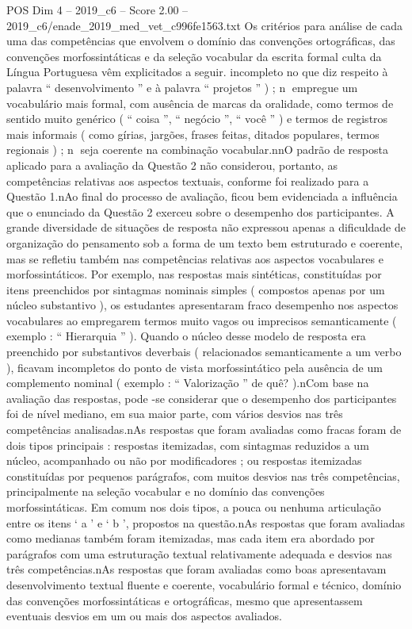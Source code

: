\begin{textsample}{POS Dim 4 – 2019\_c6 – Score 2.00 – 2019\_c6/enade\_2019\_med\_vet\_c996fe1563.txt}
Os critérios para análise de cada uma das competências que envolvem o domínio das convenções ortográficas, das convenções morfossintáticas e da seleção vocabular da escrita formal culta da Língua Portuguesa vêm explicitados a seguir. incompleto no que diz respeito à palavra “ desenvolvimento ” e à palavra “ projetos ” ) ; n empregue um vocabulário mais formal, com ausência de marcas da oralidade, como termos de sentido muito genérico ( “ coisa ”, “ negócio ”, “ você ” ) e termos de registros mais informais ( como gírias, jargões, frases feitas, ditados populares, termos regionais ) ; n seja coerente na combinação vocabular.nnO padrão de resposta aplicado para a avaliação da Questão 2 não considerou, portanto, as competências relativas aos aspectos textuais, conforme foi realizado para a Questão 1.nAo final do processo de avaliação, ficou bem evidenciada a influência que o enunciado da Questão 2 exerceu sobre o desempenho dos participantes.
A grande diversidade de situações de resposta não expressou apenas a dificuldade de organização do pensamento sob a forma de um texto bem estruturado e coerente, mas se refletiu também nas competências relativas aos aspectos vocabulares e morfossintáticos.
Por exemplo, nas respostas mais sintéticas, constituídas por itens preenchidos por sintagmas nominais simples ( compostos apenas por um núcleo substantivo ), os estudantes apresentaram fraco desempenho nos aspectos vocabulares ao empregarem termos muito vagos ou imprecisos semanticamente ( exemplo : “ Hierarquia ” ).
Quando o núcleo desse modelo de resposta era preenchido por substantivos deverbais ( relacionados semanticamente a um verbo ), ficavam incompletos do ponto de vista morfossintático pela ausência de um complemento nominal ( exemplo : “ Valorização ” de quê? ).nCom base na avaliação das respostas, pode -se considerar que o desempenho dos participantes foi de nível mediano, em sua maior parte, com vários desvios nas três competências analisadas.nAs respostas que foram avaliadas como fracas foram de dois tipos principais : respostas itemizadas, com sintagmas reduzidos a um núcleo, acompanhado ou não por modificadores ; ou respostas itemizadas constituídas por pequenos parágrafos, com muitos desvios nas três competências, principalmente na seleção vocabular e no domínio das convenções morfossintáticas.
Em comum nos dois tipos, a pouca ou nenhuma articulação entre os itens ‘ a ’ e ‘ b ’, propostos na questão.nAs respostas que foram avaliadas como medianas também foram itemizadas, mas cada item era abordado por parágrafos com uma estruturação textual relativamente adequada e desvios nas três competências.nAs respostas que foram avaliadas como boas apresentavam desenvolvimento textual fluente e coerente, vocabulário formal e técnico, domínio das convenções morfossintáticas e ortográficas, mesmo que apresentassem eventuais desvios em um ou mais dos aspectos avaliados.

\end{textsample}
